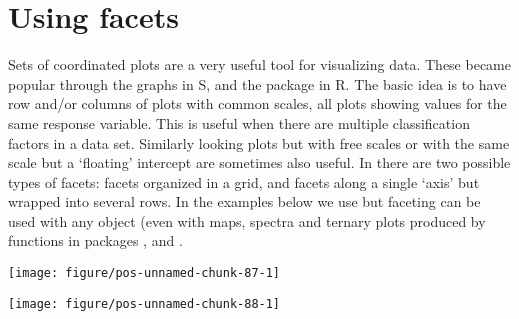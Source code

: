 \documentclass[paper=a4,headsepline,BCOR=12mm,twoside,open=right,%
titlepage,headings=small,fontsize=10pt,index=totoc,bibliography=totoc,%
captions=tableheading,captions=nooneline]{scrbook}\usepackage{knitr}
\begin{document}
\section{Using facets}

Sets of coordinated plots are a very useful tool for visualizing data. These became popular through the  graphs in S, and the  package in R. The basic idea is to have row and/or columns of plots with common scales, all plots showing values for the same response variable. This is useful when there are multiple classification factors in a data set. Similarly looking plots but with free scales or with the same scale but a `floating' intercept are sometimes also useful. In \ggplot there are two possible types of facets: facets organized in a grid, and facets along a single `axis' but wrapped into several rows. In the examples below we use  but faceting can be used with any  object (even with maps, spectra and ternary plots produced by functions in packages \ggmap, \ggspectra and \ggtern.



\begin{knitrout}\footnotesize
{}\color{fgcolor}\begin{kframe}
\begin{alltt}
 \hlkwb{<-} \hlstd{(}   \hlopt{+} \hlstd{()}
 \hlopt{+}  \hlopt{~} 
\end{alltt}
\end{kframe}

{\centering \texttt{[image: figure/pos-unnamed-chunk-87-1]} 

}



\end{knitrout}

\begin{knitrout}\footnotesize
{}\color{fgcolor}\begin{kframe}
\begin{alltt}
 \hlopt{+}  \hlopt{~} 
\end{alltt}
\end{kframe}

{\centering \texttt{[image: figure/pos-unnamed-chunk-88-1]} 

}



\end{knitrout}
\end{document}

